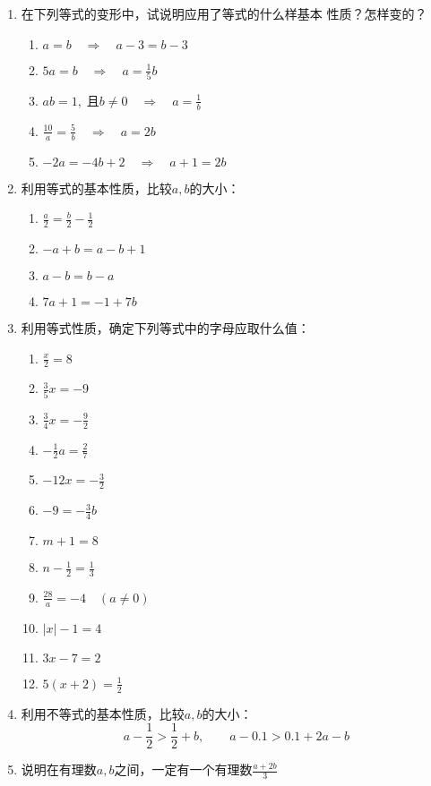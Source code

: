 \begin{enumerate}
\item  在下列等式的变形中，试说明应用了等式的什么样基本
性质？怎样变的？
\begin{enumerate}
    \item $a=b\quad \Rightarrow\quad a-3=b-3$
    \item $ 5a=b  \quad \Rightarrow\quad  a=\frac{1}{5}b $
    \item  $ ab=1,\; \text{且}b\ne 0  \quad \Rightarrow\quad  a=\frac{1}{b} $
    \item  $ \frac{10}{a}=\frac{5}{b}  \quad \Rightarrow\quad a=2b  $
    \item $ -2a=-4b+2  \quad \Rightarrow\quad  a+1=2b $
\end{enumerate}

\item 利用等式的基本性质，比较$a,b$的大小：
\begin{multicols}{2}
\begin{enumerate}
    \item $\frac{a}{2}=\frac{b}{2}-\frac{1}{2}$
    \item $-a+b=a-b+1$
    \item $a-b=b-a$
    \item $7a+1=-1+7b$
\end{enumerate}
\end{multicols}

\item 利用等式性质，确定下列等式中的字母应取什么值：
\begin{multicols}{2}
    \begin{enumerate}
        \item $\frac{x}{2}=8 $
        \item $\frac{3}{5}x=-9 $
        \item $\frac{3}{4}x=-\frac{9}{2} $
        \item $-\frac{1}{2}a=\frac{2}{7} $
        \item $-12x=-\frac{3}{2} $
        \item $-9=-\frac{3}{4}b $
        \item $m+1=8 $
        \item $n-\frac{1}{2}=\frac{1}{3} $
        \item $\frac{28}{a}=-4\quad (a\ne 0) $
        \item $|x|-1=4 $
        \item $3x-7=2 $
        \item $5(x+2)=\frac{1}{2} $
    \end{enumerate}
    \end{multicols}

\item 利用不等式的基本性质，比较$a, b$的大小：
\[a-\frac{1}{2}>\frac{1}{2}+b,\qquad a-0.1>0.1+2a-b \]

\item 说明在有理数$a, b$之间，一定有一个有理数$\frac{a+2b}{3}$
\end{enumerate}

